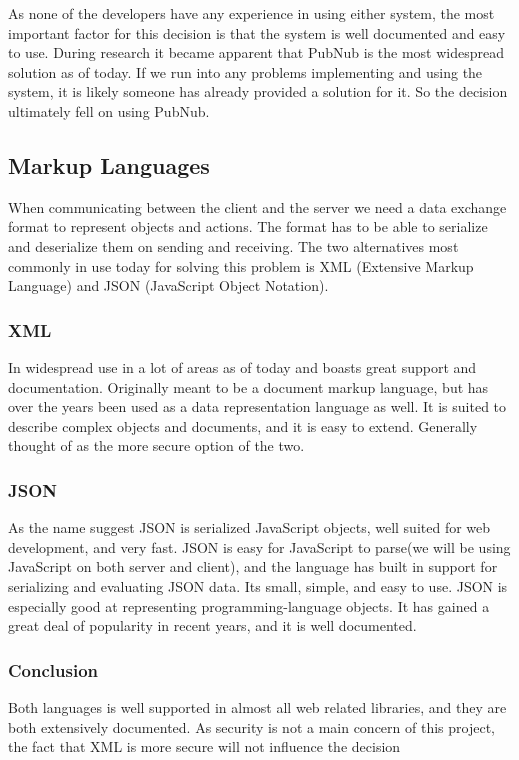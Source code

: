 As none of the developers have any experience in using either system, the most important factor for this decision is that the system is well documented and easy to use. During research it became apparent that PubNub is the most widespread solution as of today. If we run into any problems implementing and using the system, it is likely someone has already provided a solution for it. So the decision ultimately fell on using PubNub.


\subsection{Markup Languages}
When communicating between the client and the server we need a data exchange format to represent objects and actions. The format has to be able to serialize and deserialize them on sending and receiving. The two alternatives most commonly in use today for solving this problem is XML (Extensive Markup Language) and JSON (JavaScript Object Notation).

\subsubsection{XML}
In widespread use in a lot of areas as of today and boasts great support and documentation. Originally meant to be a document markup language, but has over the years been used as a data representation language as well. It is suited to describe complex objects and documents, and it is easy to extend. Generally thought of as the more secure option of the two.

\subsubsection{JSON}
As the name suggest JSON is serialized JavaScript objects, well suited for web development, and very fast. JSON is easy for JavaScript to parse(we will be using JavaScript on both server and client), and the language has built in support for serializing and evaluating JSON data. Its small, simple, and easy to use. JSON is especially good at representing programming-language objects. It has gained a great deal of popularity in recent years, and it is well documented.

\subsubsection{Conclusion}
Both languages is well supported in almost all web related libraries, and they are both extensively documented. As security is not a main concern of this project, the fact that XML is more secure will not influence the decision


